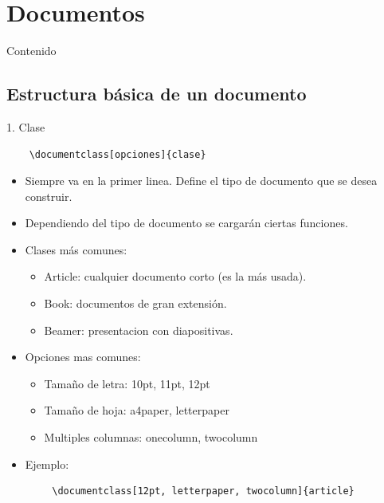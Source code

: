 \documentclass[dvipsnames,xcolor, handout]{beamer}
\theoremstyle{plain}
\theoremstyle{definition}
\begin{document}
\section{Documentos}
\begin{frame}{Contenido}
  \tableofcontents[currentsection]%
\end{frame}
\subsection{Estructura básica de un documento}
\begin{frame}[fragile]{1. Clase}
\begin{verbatim}
    \documentclass[opciones]{clase}
\end{verbatim}
\vspace*{-0.5cm}
\begin{itemize}
    \item Siempre va en la primer linea. Define el tipo de documento que se desea construir. 
    \item Dependiendo del tipo de documento se cargarán ciertas funciones.
    \item Clases más comunes:
    \begin{itemize}
        \item Article: cualquier documento corto (es la más usada).
        \item Book: documentos de gran extensión.
        \item Beamer: presentacion con diapositivas.
    \end{itemize}
    \item Opciones mas comunes:
    \begin{itemize}
        \item Tamaño de letra: 10pt, 11pt, 12pt
        \item Tamaño de hoja: a4paper, letterpaper
        \item Multiples columnas: onecolumn, twocolumn
    \end{itemize}
    \item Ejemplo:
\end{itemize}
\vspace*{-0.5cm}
\begin{small}
\begin{verbatim}
        \documentclass[12pt, letterpaper, twocolumn]{article}
    \end{verbatim}
\end{small}

    
\end{frame}
\end{document}
